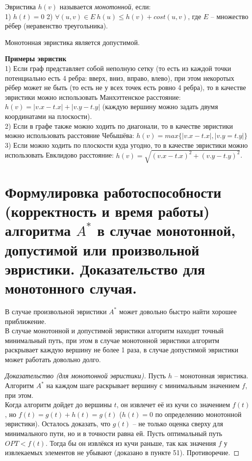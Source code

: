 \begin{definition}
     Эвристика $h(v)$ называется \textit{монотонной}, если:\\
     1) $h(t) = 0$
     2) $\forall (u, v) \in E \: h(u) \leq h(v) + cost(u, v)$, где $E$ -- множество рёбер (неравенство треугольника).
\end{definition}

\begin{corollary}
    Монотонная эвристика является допустимой.
\end{corollary}

\textbf{Примеры эвристик}\\

    1) Если граф представляет собой неполную сетку (то есть из каждой точки потенциально есть 4 ребра: вверх, вниз, вправо, влево), при этом некоротых рёбер может не быть (то есть не у всех точек есть ровно 4 ребра), то в качестве эвристики можно использовать Манхэттенское расстояние: $h(v) = |v.x - t.x| + |v.y - t.y|$ (каждую вершину можно задать двумя координатами на плоскости).\\
    
    2) Если в графе также можно ходить по диагонали, то в качестве эвристики можно использовать расстояние Чебышёва: $h(v) = max\{|v.x - t.x|, |v.y = t.y|\}$\\
    
    3) Если можно ходить по плоскости куда угодно, то в качестве эвристики можно использовать Евклидово расстояние: $h(v) = \sqrt{(v.x - t.x)^2 + (v.y - t.y)^2}$.\\
    

\setcounter{section}{52}
\section{Формулировка работоспособности (корректность и время работы) алгоритма $A^*$ в случае монотонной, допустимой или произвольной эвристики. Доказательство для монотонного случая.}

В случае произвольной эвристики $A^*$ может довольно быстро найти хорошее приближение.\\

В случае монотонной и допустимой эвристики алгоритм находит точный минимальный путь, при этом в случае монотонной эвристики алгоритм раскрывает каждую вершину не более 1 раза, в случае допустимой эвристики может работать довольно долго.\\

\begin{proof}[Доказательство (для монотонной эвристики)]
    Пусть $h$ -- монотонная эвристика. Алгоритм $A^*$ на каждом шаге раскрывает вершину с минимальным значением $f$, при этом.\\
    Когда алгоритм дойдет до вершины $t$, он извлечет её из кучи со значением $f(t)$, но $f(t) = g(t) + h(t) = g(t)$ ($h(t) = 0$ по определению монотонной эвристики). Осталось доказать, что $g(t)$ -- не только оценка сверху для минимального пути, но и в точности равна ей. Пусть оптимальный путь $OPT < f(t)$. Тогда бы он извлёкся из кучи раньше, так как значения $f$ у извлекаемых элементов не убывают (доказано в пункте 51). Противоречие.
\end{proof}